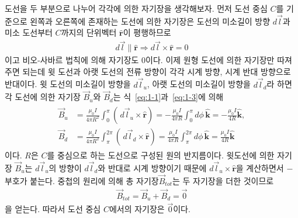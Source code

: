 \documentclass[tightenlines,floatfix,nofootinbib,superscriptaddress,fleqn]{revtex4}
\begin{document}
\vspace{1cm}
도선을 두 부분으로 나누어 각각에 의한 자기장을 생각해보자.
먼저 도선 중심 $C$를 기준으로 왼쪽과 오른쪽에 존재하는 도선에 의한 자기장은
도선의 미소길이 방향 $d\vec{l}$과 미소 도선부터 $C$까지의 단위벡터 $\hat{\bm r}$이
평행하므로
\begin{align}
  d\vec{l}\parallel \hat{\bm r} \Longrightarrow
  d\vec{l}\times \hat{\bm r}=0
\end{align}
이고 비오-사바르 법칙에 의해 자기장도 $0$이다.
이제 원형 도선에 의한 자기장만 따져주면 되는데 윗 도선과 아랫 도선의 전류 방향이
각각 시계 방향, 시계 반대 방향으로 반대이다. 
윗 도선의 미소길이 방향을 $d\vec{l}_{u}$, 아랫 도선의 미소길이 방향을 $d\vec{l}_{d}$라 
하면 각 도선에 의한 자기장 $\vec{B}_{u}$와 $\vec{B}_d$는 
식~\eqref{eq:1-1}과~\eqref{eq:1-3}에 의해
\begin{align}
  \begin{split}
    \vec{B}_{u}&=\frac{\mu_0I}{4\pi R^2}\int^{\pi}_{0}
    ({\,d\vec{l}_u\times \hat{\bm r}})
    =-\frac{\mu_0I}{4\pi R}\int^{\pi}_{0}d\phi\,\hat{\bm k}
    =-\frac{\mu_0I}{4 R}\hat{\bm k},  \\
    \vec{B}_{d}&=\frac{\mu_0I}{4\pi R^2}\int^{2\pi}_{\pi}
    ({\,d\vec{l}_d\times \hat{\bm r}})
    =\frac{\mu_0I}{4\pi R}\int^{2\pi}_{\pi}d\phi\,\hat{\bm k}
    =\frac{\mu_0I}{4 R}\hat{\bm k}  
  \end{split}
\end{align}
이다. $R$은 $C$를 중심으로 하는 도선으로 구성된 원의 반지름이다. 윗도선에 의한 자기장 
$\vec{B}_u$는 $d\vec{l}_{u}$의 방향이 $d\vec{l}_{d}$와 반대로 시계 방향이기 때문에 
$d\vec{l}_u\times \hat{\bm r}$을 계산하면서 $-$부호가 붙는다. 중첩의 원리에 의해
총 자기장$\vec{B}_{tot}$는 두 자기장을 더한 것이므로
\begin{align}
  \vec{B}_{tot} = \vec{B}_{u}+\vec{B}_{d} = \vec{0}
\end{align}
을 얻는다. 따라서 도선 중심 $C$에서의 자기장은 $\vec{0}$이다.

\vspace{1cm}
\end{document}
